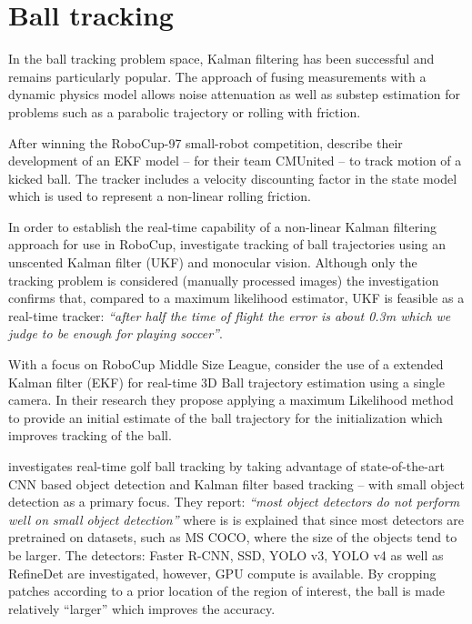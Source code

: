 \documentclass[a4paper,twoside,12pt]{report}
\begin{document}
\section{Ball tracking}

In the ball tracking problem space, Kalman filtering has been successful and remains particularly popular. The approach of fusing measurements with a dynamic physics model allows noise attenuation as well as substep estimation for problems such as a parabolic trajectory or rolling with friction.

After winning the RoboCup-97 small-robot competition, \cite{kalmanmodel} describe their development of an EKF model -- for their team CMUnited -- to track motion of a kicked ball. The tracker includes a velocity discounting factor in the state model which is used to represent a non-linear rolling friction. 

In order to establish the real-time capability of a non-linear Kalman filtering approach for use in RoboCup, \cite{robocuptrack} investigate tracking of ball trajectories using an unscented Kalman filter (UKF) and monocular vision. Although only the tracking problem is considered (manually processed images) the investigation confirms that, compared to a maximum likelihood estimator, UKF is feasible as a real-time tracker: \textit{``after half the time of flight the error is about 0.3m which we judge to be enough for playing soccer''}.

With a focus on RoboCup Middle Size League, \cite{3dparabola} consider the use of a extended Kalman filter (EKF) for real-time 3D Ball trajectory estimation using a single camera. In their research they propose applying a maximum Likelihood method to provide an initial estimate of the ball trajectory for the initialization which improves tracking of the ball.

\cite{golftrack} investigates real-time golf ball tracking by taking advantage of state-of-the-art CNN based object detection and Kalman filter based tracking -- with small object detection as a primary focus. They report: \textit{``most object detectors do not perform well on small object detection''} where is is explained that since most detectors are pretrained on datasets, such as MS COCO, where the size of the objects tend to be larger. The detectors: Faster R-CNN, SSD, YOLO v3, YOLO v4 as well as RefineDet are investigated, however, GPU compute is available. By cropping patches according to a prior location of the region of interest, the ball is made relatively “larger” which improves the accuracy.  
\end{document}
